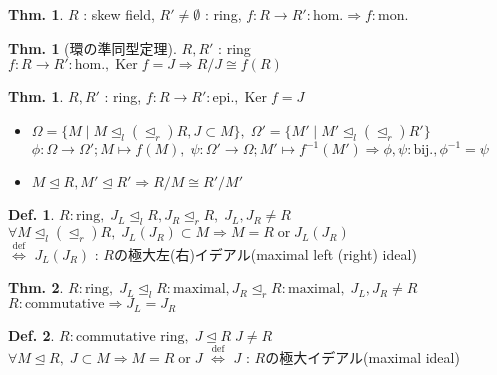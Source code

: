 \documentclass[uplatex,dvipdfmx,9pt]{beamer}
\newcommand{\defarrow}{\overset{\mathrm{def}}{\Leftrightarrow}}
\newcommand{\inverse}[1]{#1^{-1}}
\newcommand{\Ker}{\operatorname{Ker}}
\newcommand{\lideal}{\trianglelefteq_l}
\newcommand{\rideal}{\trianglelefteq_r}
\newcommand{\ideal}{\trianglelefteq}
\newcommand{\bij}{\text{bij.}}
\renewcommand{\hom}{\text{hom.}} %
\newcommand{\mon}{\text{mon.}} %
\newcommand{\epi}{\text{epi.}} %
\newcounter{textThmCount}
\theoremstyle{definition} %
\newtheorem{defn}{Def.}[subsection] %
\newtheorem{thm}{Thm.}[subsection] %
\newtheorem{thmText}[textThmCount]{Thm.}
\theoremstyle{example}
\begin{document}
    \begin{frame}

      \begin{thm}
        $R$ : skew field, $R' \neq \emptyset$ : ring, $f\colon R \to R' : \hom \Rightarrow f : \mon$
      \end{thm}

      \begin{thmText}[環の準同型定理]
        $R, R'$ : ring \\
        $f\colon R \to R' : \hom, \Ker f = J \Rightarrow R/J \cong f(R)$ 
      \end{thmText}

      \begin{thmText}
         $R, R'$ : ring, $f\colon R \to R' : \epi, \Ker f = J$ \\
        \begin{itemize}
          \item $\Omega = \{M \mid M \lideal(\rideal) R, J \subset M\}, \; \Omega' = \{M' \mid M' \lideal(\rideal) R'\}$ \\ 
                $\phi\colon \Omega \to \Omega' ; M \mapsto f(M), \; \psi\colon \Omega' \to \Omega ; M' \mapsto \inverse{f}(M') \Rightarrow \phi, \psi : \bij, \inverse{\phi} = \psi$
          \item $M \ideal R, M' \ideal R' \Rightarrow R/M \cong R'/M'$
        \end{itemize}       
      \end{thmText}
      
    \end{frame}

    \begin{frame}

      \begin{defn}
        $R : \text{ring}, \; J_L \lideal R, J_R \rideal R, \; J_L, J_R \neq R$ \\
        $\forall M \lideal (\rideal) R, \; J_L(J_R) \subset M \Rightarrow M = R \; \text{or} \; J_L(J_R)$ \\
        $\defarrow$ $J_L(J_R)$ : $R$の\alert{極大左(右)イデアル(maximal left (right) ideal)} \\
      \end{defn}

      \begin{thm}
        $R : \text{ring}, \; J_L \lideal R : \text{maximal}, J_R \rideal R : \text{maximal}, \; J_L, J_R \neq R$ \\
        $R : \text{commutative} \Rightarrow J_L = J_R$ 
      \end{thm}

      \begin{defn}
        $R : \text{commutative ring}, \; J \ideal R\; J \neq R$ \\
        $\forall M \ideal R, \; J \subset M \Rightarrow M = R \; \text{or} \; J$ $\defarrow$ $J$ : $R$の\alert{極大イデアル(maximal ideal)}
      \end{defn}
     
    \end{frame}
\end{document}
